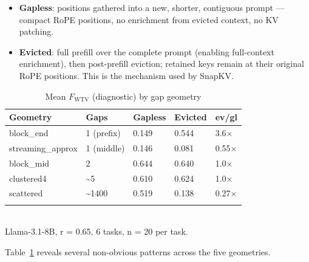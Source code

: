 \documentclass[10pt,letterpaper]{article}
\providecommand{\tightlist}{%
  \setlength{\itemsep}{0pt}\setlength{\parskip}{0pt}}
\begin{document}
\begin{itemize}
\tightlist
\item
  \textbf{Gapless}: positions gathered into a new, shorter, contiguous
  prompt --- compact RoPE positions, no enrichment from evicted context,
  no KV patching.
\item
  \textbf{Evicted}: full prefill over the complete prompt (enabling
  full-context enrichment), then post-prefill eviction; retained keys
  remain at their original RoPE positions. This is the mechanism used by
  SnapKV.
\end{itemize}

\begin{table}[H]
\centering
\small
\caption{Mean \(F_{\text{WTV}}\) (diagnostic) by gap geometry}
\label{tab:t2}
\begin{tabular}{@{}lllll@{}}
\toprule
Geometry & Gaps & Gapless & Evicted & ev/gl\\
\midrule
block\_end & 1 (prefix) & 0.149 & 0.544 & 3.6×\\
streaming\_approx & 1 (middle) & 0.146 & 0.081 & 0.55×\\
block\_mid & 2 & 0.644 & 0.640 & 1.0×\\
clustered4 & \textasciitilde5 & 0.610 & 0.624 & 1.0×\\
scattered & \textasciitilde1400 & 0.519 & 0.138 & 0.27×\\
\bottomrule
\\
\end{tabular}
\\Llama-3.1-8B, r = 0.65, 6 tasks, n = 20 per task.
\end{table}

Table~\ref{tab:t2} reveals several non-obvious patterns across the five geometries.
\end{document}
